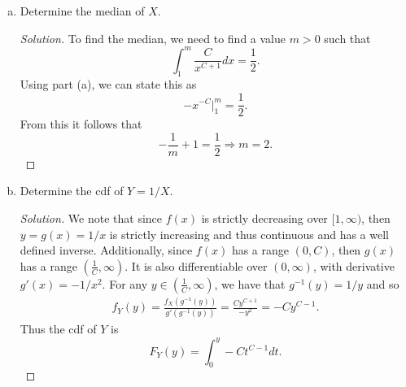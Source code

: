 \documentclass[12pt]{article}
\newenvironment{solution}
{\renewcommand\qedsymbol{$\blacksquare$}\begin{proof}[Solution]}
{\end{proof}}
\begin{document}
\begin{enumerate}
\begin{enumerate}[(a)]
\begin{solution}
                    \end{solution}
                \item Determine the median of $X$. 
                    \begin{solution}
                        To find the median, we need to find a value $m>0$ such
                        that 
                        \begin{equation*}
                            \int_{1}^{m}\frac{C}{x^{C+1}}dx=\frac{1}{2}.
                        \end{equation*}
                        Using part (a), we can state this as 
                        \begin{equation*}
                            -x^{-C}\bigg|_{1}^{m}=\frac{1}{2}.
                        \end{equation*}
                        From this it follows that 
                        \begin{equation*}
                            -\frac{1}{m}+1=\frac{1}{2}\Rightarrow m=2.
                        \end{equation*}
                    \end{solution}
                \item Determine the cdf of $Y=1/X$. 
                    \begin{solution}
                        We note that since $f(x)$ is strictly decreasing over
                        $[1, \infty)$, then $y=g(x)=1/x$ is strictly increasing
                        and thus continuous and has a well defined inverse.
                        Additionally, since $f(x)$ has a range $(0, C)$, then
                        $g(x)$ has a range $(\frac{1}{C}, \infty)$.  
                        It is also differentiable over $(0, \infty)$, with
                        derivative $g'(x)=-1/x^2$. For any $y\in(\frac{1}{C}, \infty)$,
                        we have that $g^{-1}(y)=1/y$ and so
                        \begin{align*}
                            f_Y(y)=\frac{f_X(g^{-1}(y))}{g'(g^{-1}(y))} 
                                =\frac{Cy^{C+1}}{-y^2}=-Cy^{C-1}.
                        \end{align*}
                        Thus the cdf of $Y$ is 
                        \begin{equation*}
                            F_Y(y)=\int_{0}^{y}-Ct^{C-1}dt.
                        \end{equation*}
                    \end{solution}
            \end{enumerate}
    \end{enumerate}
\end{document}
